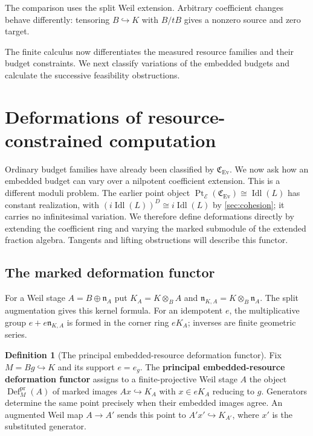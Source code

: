 \documentclass[11pt,a4paper]{article}
\numberwithin{algorithm}{section}
\numberwithin{equation}{section}
\theoremstyle{definition}
\newtheorem{definition}[definition]{Definition}
\theoremstyle{remark}
\theoremstyle{plain}
\newcommand{\E}{\mathcal E}
\newcommand{\Idl}{\operatorname{Idl}}
\newcommand{\incl}{\hookrightarrow}
\newcommand{\Ev}{{\operatorname{Ev}}}
\newcommand{\Cplx}{\mathfrak C_{\Ev}}
\theoremstyle{definition}
\theoremstyle{plain}
\begin{document}
The comparison uses the split Weil extension. Arbitrary coefficient
changes behave differently: tensoring $B\incl K$ with $B/tB$ gives
a nonzero source and zero target.

The finite calculus now differentiates the measured resource families
and their budget constraints. We next classify variations of the
embedded budgets and calculate the successive feasibility obstructions.

\section{Deformations of resource-constrained computation}
\label{sec:resource-deformations}

Ordinary budget families have already been classified by $\Cplx$.
We now ask how an embedded budget can vary over a nilpotent
coefficient extension. This is a different moduli problem.
The earlier point object
$\operatorname{Pt}_{\E}(\Cplx)\cong\Idl(L)$ has constant
realization, with $(i\Idl(L))^D\cong i\Idl(L)$ by
\cref{sec:cohesion}; it carries no infinitesimal variation.
We therefore define deformations directly by extending the
coefficient ring and varying the marked submodule of the
extended fraction algebra. Tangents and lifting obstructions
will describe this functor.


\subsection{The marked deformation functor}
\label{sec:resource-deformation-functor}
For a Weil stage $A=B\oplus\mathfrak n_A$ put
$K_A=K\otimes_BA$ and
$\mathfrak n_{K,A}=K\otimes_B\mathfrak n_A$.
The split augmentation gives this kernel formula. For an idempotent
$e$, the multiplicative group $e+e\mathfrak n_{K,A}$ is formed in
the corner ring $eK_A$; inverses are finite geometric series.


\begin{definition}[The principal embedded-resource deformation functor]
\label{def:principal-deformation-functor}
Fix $M=Bg\incl K$ and its support $e=e_g$.  The \textbf{principal embedded-resource deformation functor}
assigns to a finite-projective Weil stage $A$ the
object $\operatorname{Def}^{\mathrm{pr}}_M(A)$ of marked images $Ax\incl K_A$ with $x\in eK_A$ reducing
to $g$.  Generators determine the same point precisely when their
embedded images agree.  An augmented Weil map $A\to A'$ sends
this point to $A'x'\incl K_{A'}$, where $x'$ is the substituted
generator.
\end{definition}
\end{document}
